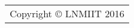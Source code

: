 \thispagestyle{empty}
\small
\strut\vfill \begin{tabular}{@{}p{\textwidth}@{}}
	\midrule	
	\noindent Copyright \copyright{} LNMIIT 2016\\
	\end{tabular}
\clearpage

